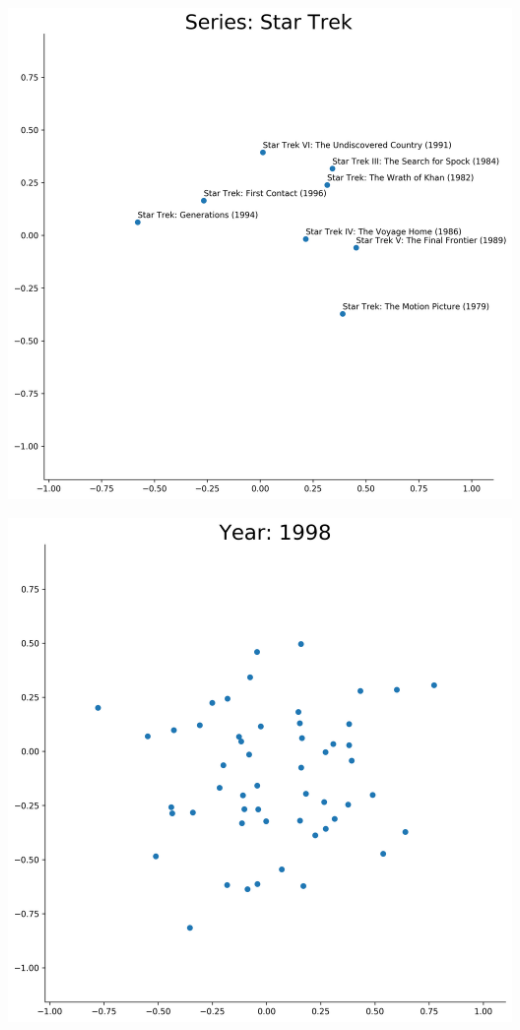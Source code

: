 \begin{appendices}
\begin{center}
\begin{minipage}{0.48\linewidth}
\end{minipage}
\begin{minipage}{0.48\linewidth}
\includegraphics[scale=0.35]{"Series: Star Trek"}
\end{minipage}
\hfill %
\begin{minipage}{0.48\linewidth}
\includegraphics[scale=0.35]{"Year: 1998"}

\end{minipage}
\end{center}
\end{appendices}
